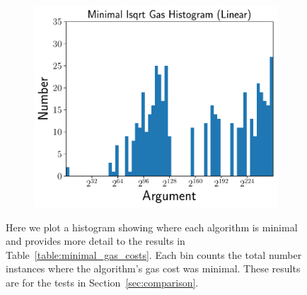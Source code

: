 \begin{figure}[p]
    \begin{subfigure}[t]{0.45\textwidth}
    \includegraphics[width=\textwidth]{plots/minimal_hist_Linear.pdf}
    \end{subfigure}
    \caption{Here we plot a histogram showing where each algorithm is minimal
        and provides more detail to the results
        in Table~\ref{table:minimal_gas_costs}.
        Each bin counts the total number instances where the algorithm's
        gas cost was minimal.
        These results are for the tests in Section~\ref{sec:comparison}.
        }
    \label{fig:minimal_gas_hist}
\end{figure}
